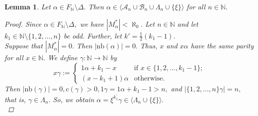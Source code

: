 \documentclass[11pt]{article}
\theoremstyle{plain}
\newtheorem{lemma}[theorem]{Lemma}
\theoremstyle{definition}
\newcommand{\collapse}{\mathrm{c}}
\newcommand{\nb}{\mathrm{nb}}
\begin{document}
\begin{lemma}\label{Proposition7}
Let $\alpha\in F_{\mathbb{N}}\setminus\Delta.$ Then $\alpha\in\langle\mathcal{A}_{n}\cup\mathcal{B}_{n}\cup\Lambda_{n}\cup\{\xi\} \rangle$ for all $n\in\mathbb{N}.$ 
\begin{proof}
Since $\alpha\in F_{\mathbb{N}}\setminus\Delta,$ we have $\left\vert M_{\alpha}^{*}\right\vert<\aleph_{0}.$ Let $n\in\mathbb{N}$ and let $k_{1}\in\mathbb{N}\setminus\{1,2,\ldots,n\}$ be odd. Further, let $k'=\frac{1}{2}(k_{1}-1).$\\
\noindent Suppose that $\left\vert M_{\alpha}^{*}\right\vert=0.$ Then $\left\vert \nb(\alpha)\right\vert=0.$ Thus, $x$ and $x\alpha$ have the same parity for all $x\in\mathbb{N}.$ We define $\gamma:\mathbb{N}\to\mathbb{N}$ by
$$x\gamma:=\begin{cases}
1\alpha+k_{1}-x~~&\text{if }x\in\{1,2,\ldots, k_{1}-1\};\\
(x-k_{1}+1)\alpha&\text{otherwise}.
\end{cases}$$
Then $\left\vert \nb(\gamma)\right\vert=0,\collapse(\gamma)>0,1\gamma=1\alpha+k_{1}-1>n,$ and $\left\vert \{1,2,\ldots,n\}\gamma\right\vert=n,$ that is, $\gamma\in\Lambda_{n}.$ So, we obtain $\alpha=\xi^{k_{1}^{'}}\gamma\in\langle \Lambda_{n}\cup\{\xi\}\rangle.$\\


\end{proof}
\end{lemma}
\end{document}
